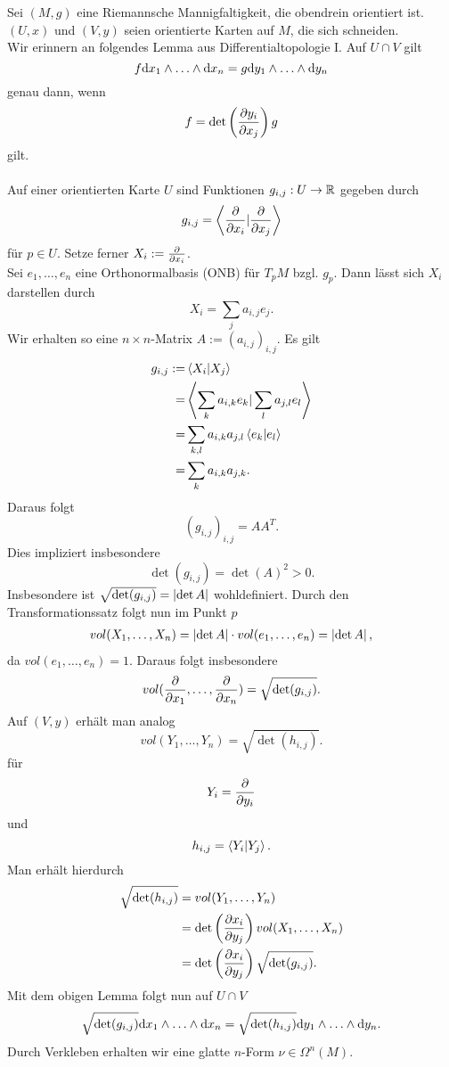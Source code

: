 
Sei $(M,g)$ eine Riemannsche Mannigfaltigkeit, die obendrein orientiert ist. $(U,x)$ und $(V,y)$ seien orientierte Karten auf $M$, die sich schneiden.\\
Wir erinnern an folgendes Lemma aus Differentialtopologie I.
\Lem{}
Auf $U\cap V$ gilt
\[ f\text{d} x_1 \wedge \ldots \wedge \text{d} x_n = g \text{d} y_1 \wedge \ldots \wedge \text{d} y_n \]
genau dann, wenn
\[ f = \det\left( \frac{\partial y_i}{\partial x_j} \right) g \]
gilt.\\\\
Auf einer orientierten Karte $U$ sind Funktionen $g_{i,j} : U \overset{}{\rightarrow} \mathbb{R}$ gegeben durch
\[ g_{i,j} = \left<\frac{\partial }{\partial x_i}|\frac{\partial }{\partial x_j} \right> \]
für $p \in U$. Setze ferner $X_i := \frac{\partial }{\partial x_i}$.\\
Sei $e_1,\ldots, e_n$ eine {Orthonormalbasis} (ONB) für $T_pM$ bzgl. $g_p$. Dann lässt sich $X_i$ darstellen durch
\[ X_i = \sum_j a_{i,j}e_j. \]
Wir erhalten so eine $n\times n$-Matrix $A := (a_{i,j})_{i,j}$. Es gilt
\begin{align*}
g_{i,j} :=& \left<X_i|X_j\right>\\
=& \left< \sum_k a_{i,k}e_k| \sum_l a_{j,l}e_l  \right>\\
=& \sum_{k,l} a_{i,k}a_{j,l} \left<e_k|e_l\right>\\
=& \sum_k a_{i,k}a_{j,k}.
\end{align*}
Daraus folgt
\[ (g_{i,j})_{i,j} = AA^T. \]
Dies impliziert insbesondere
\[ \det(g_{i,j}) = \det(A)^2 > 0. \]
Insbesondere ist $\sqrt{\det(g_{i,j})} = \left|\det A\right|$ wohldefiniert. Durch den Transformationssatz folgt nun im Punkt $p$
\begin{align*}
vol(X_1, \ldots, X_n) = \left|\det A\right| \cdot vol(e_1, \ldots, e_n) = \left|\det A\right|,
\end{align*}
da $vol(e_1, \ldots, e_n) = 1$. Daraus folgt insbesondere
\[ vol(\frac{\partial }{\partial x_1}, \ldots, \frac{\partial }{\partial x_n}) = \sqrt{\det (g_{i,j})}. \]
Auf $(V,y)$ erhält man analog
\[ vol(Y_1, \ldots, Y_n) = \sqrt{\det (h_{i,j})}. \]
für
\[ Y_i = \frac{\partial }{\partial y_i} \]
und
\[ h_{i,j} = \left<Y_i|Y_j\right>. \]
Man erhält hierdurch
\begin{align*}
\sqrt{\det (h_{i,j})} &= vol(Y_1, \ldots, Y_n)\\
&= \det \left( \frac{\partial x_i}{\partial y_j} \right) vol(X_1, \ldots, X_n)\\
&=  \det \left( \frac{\partial x_i}{\partial y_j} \right) \sqrt{\det (g_{i,j})}.
\end{align*}
Mit dem obigen Lemma folgt nun auf $U\cap V$
\[ \sqrt{\det (g_{i,j})} \text{d} x_1\wedge \ldots \wedge \text{d} x_n = \sqrt{\det (h_{i,j})} \text{d} y_1\wedge \ldots \wedge \text{d} y_n.  \]
Durch Verkleben erhalten wir eine glatte $n$-Form $\nu \in \Omega^n(M)$.


